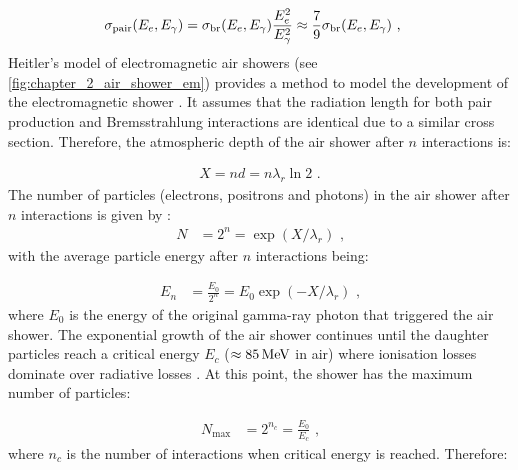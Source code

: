 \begin{equation}
    \begin{aligned}
    \sigma_\text{pair}\qty(E_e,E_\gamma)&=\sigma_\text{br}\qty(E_e,E_\gamma)\frac{E_e^2}{E_\gamma^2}\approx \frac{7}{9}\sigma_\text{br}\qty(E_e,E_\gamma)\text{ ,}
    \end{aligned} \label{eq:chapter_2_pair_prod_cs}
\end{equation}
\newpar 
Heitler's model of electromagnetic air showers (see \autoref{fig:chapter_2_air_shower_em}) provides a method to model the development of the electromagnetic shower \citep{1934RSPSA.146...83B}. It assumes that the radiation length for both pair production and Bremsstrahlung interactions are identical due to a similar cross section. Therefore, the atmospheric depth of the air shower after $n$ interactions is:

\begin{equation}
    \begin{aligned}
    X=nd=n\lambda_r\ln 2\text{ .}
    \end{aligned} \label{eq:chapter_2_gas_depth}
\end{equation}
\noindent The number of particles (electrons, positrons and photons) in the air shower after $n$ interactions is given by \citep{MATTHEWS2005387}:
\begin{equation}
    \begin{aligned}
    N&=2^n=\exp(X/\lambda_r)\text{ ,}
    \end{aligned}
\end{equation}
\noindent with the average particle energy after $n$ interactions being:

\begin{equation}
    \begin{aligned}
    E_n&=\frac{E_0}{2^n}=E_0\exp(-X/\lambda_r)\text{ ,}
    \end{aligned}
\end{equation}
\noindent where $E_0$ is the energy of the original gamma-ray photon that triggered the air shower.
\newpar 
The exponential growth of the air shower continues until the daughter particles reach a critical energy $E_c$ ($\approx 85\,\si{\mega\electronvolt}$ in air) where ionisation losses dominate over radiative losses \citep{1954qtr..book.....H}. At this point, the shower has the maximum number of particles:

\begin{equation}
    \begin{aligned}
    N_\text{max}&=2^{n_c} = \frac{E_0}{E_c}\text{ ,}
    \end{aligned} \label{eq:chapter_1_gas_max_particles} 
\end{equation}
\noindent where $n_c$ is the number of interactions when critical energy is reached. Therefore:

